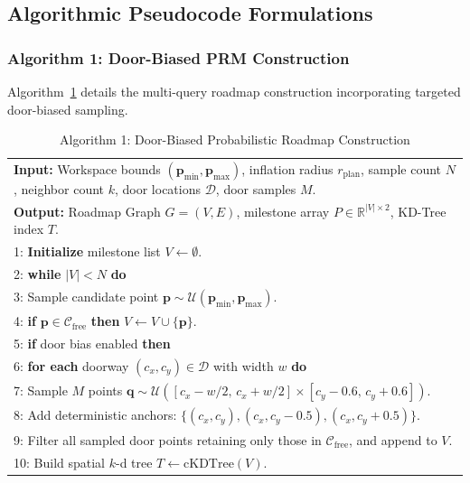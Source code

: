 \documentclass[12pt,a4paper]{article}
\begin{document}
\subsection{Algorithmic Pseudocode Formulations}

\subsubsection{Algorithm 1: Door-Biased PRM Construction}
Algorithm~\ref{alg:prm_build} details the multi-query roadmap construction incorporating targeted door-biased sampling.

\begin{table}[H]
\centering
\caption{Algorithm 1: Door-Biased Probabilistic Roadmap Construction}
\label{alg:prm_build}
{\small
\begin{tabular}{|p{\dimexpr\linewidth-2\tabcolsep-2\arrayrulewidth\relax}|}
\hline
\textbf{Input:} Workspace bounds $(\mathbf{p}_{\min}, \mathbf{p}_{\max})$, inflation radius $r_{\text{plan}}$, sample count $N$, neighbor count $k$, door locations $\mathcal{D}$, door samples $M$. \\
\textbf{Output:} Roadmap Graph $G = (V, E)$, milestone array $P \in \mathbb{R}^{|V| \times 2}$, KD-Tree index $T$. \\ \hline
1: \textbf{Initialize} milestone list $V \leftarrow \emptyset$. \\
2: \textbf{while} $|V| < N$ \textbf{do} \\
3: \quad Sample candidate point $\mathbf{p} \sim \mathcal{U}(\mathbf{p}_{\min}, \mathbf{p}_{\max})$. \\
4: \quad \textbf{if} $\mathbf{p} \in \mathcal{C}_{\text{free}}$ \textbf{then} $V \leftarrow V \cup \{\mathbf{p}\}$. \\
5: \textbf{if} door bias enabled \textbf{then} \\
6: \quad \textbf{for each} doorway $(c_x, c_y) \in \mathcal{D}$ with width $w$ \textbf{do} \\
7: \qquad Sample $M$ points $\mathbf{q} \sim \mathcal{U}([c_x - w/2, \, c_x + w/2] \times [c_y - 0.6, \, c_y + 0.6])$. \\
8: \qquad Add deterministic anchors: $\{(c_x, c_y), (c_x, c_y - 0.5), (c_x, c_y + 0.5)\}$. \\
9: \qquad Filter all sampled door points retaining only those in $\mathcal{C}_{\text{free}}$, and append to $V$. \\
10: Build spatial $k$-d tree $T \leftarrow \text{cKDTree}(V)$. \\

\end{tabular}}
\end{table}
\end{document}
